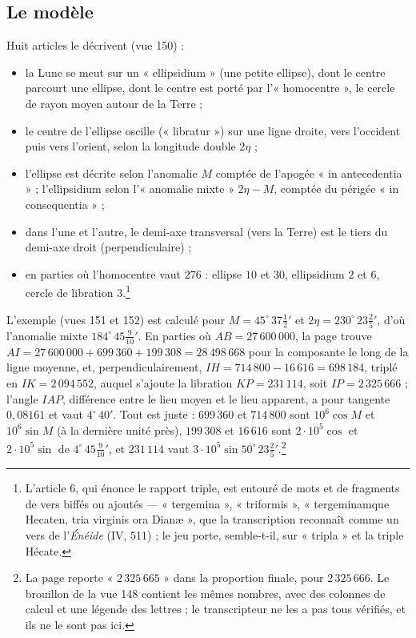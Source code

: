 \documentclass[11pt,a4paper]{article}
\begin{document}
\subsection*{Le modèle}

Huit articles le décrivent (vue 150) :
\begin{itemize}
  \item la Lune se meut sur un « ellipsidium » (une petite ellipse), dont le centre
    parcourt une ellipse, dont le centre est porté par l'« homocentre », le cercle
    de rayon moyen autour de la Terre ;
  \item le centre de l'ellipse oscille (« libratur ») sur une ligne droite, vers
    l'occident puis vers l'orient, selon la longitude double $2\eta$ ;
  \item l'ellipse est décrite selon l'anomalie $M$ comptée de l'apogée « in
    antecedentia » ; l'ellipsidium selon l'« anomalie mixte » $2\eta - M$, comptée
    du périgée « in consequentia » ;
  \item dans l'une et l'autre, le demi-axe transversal (vers la Terre) est le tiers
    du demi-axe droit (perpendiculaire) ;
  \item en parties où l'homocentre vaut $276$ : ellipse $10$ et $30$, ellipsidium
    $2$ et $6$, cercle de libration $3$.\footnote{L'article 6, qui énonce le rapport
    triple, est entouré de mots et de fragments de vers biffés ou ajoutés —
    « tergemina », « triformis », « tergeminamque Hecaten, tria virginis ora
    Dianæ », que la transcription reconnaît comme un vers de l'\emph{Énéide} (IV,
    511) ; le jeu porte, semble-t-il, sur « tripla » et la triple Hécate.}
\end{itemize}

L'exemple (vues 151 et 152) est calculé pour $M = 45^\circ\,37\tfrac12'$ et
$2\eta = 230^\circ\,23\tfrac25'$, d'où l'anomalie mixte
$184^\circ\,45\tfrac{9}{10}'$. En parties où $AB = 27\,600\,000$, la page trouve
$AI = 27\,600\,000 + 699\,360 + 199\,308 = 28\,498\,668$ pour la composante le long
de la ligne moyenne, et, perpendiculairement, $IH = 714\,800 - 16\,616 = 698\,184$,
triplé en $IK = 2\,094\,552$, auquel s'ajoute la libration $KP = 231\,114$, soit
$IP = 2\,325\,666$ ; l'angle $IAP$, différence entre le lieu moyen et le lieu
apparent, a pour tangente $0{,}08161$ et vaut $4^\circ\,40'$. Tout est juste :
$699\,360$ et $714\,800$ sont $10^6\cos M$ et $10^6\sin M$ (à la dernière unité
près), $199\,308$ et $16\,616$ sont $2 \cdot 10^5\cos$ et $2 \cdot 10^5\sin$ de
$4^\circ\,45\tfrac{9}{10}'$, et $231\,114$ vaut $3 \cdot 10^5 \sin 50^\circ\,23\tfrac25'$.\footnote{La
page reporte « $2\,325\,665$ » dans la proportion finale, pour $2\,325\,666$. Le
brouillon de la vue 148 contient les mêmes nombres, avec des colonnes de calcul et
une légende des lettres ; le transcripteur ne les a pas tous vérifiés, et ils ne
le sont pas ici.}
\end{document}

